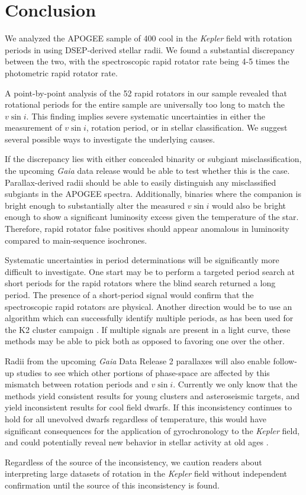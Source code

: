 \documentclass[manuscript]{aastex6}
\newcommand{\vsini}{\ensuremath{v \sin i}}
\newcommand{\Kepler}{\mbox{\textit{Kepler}}}
\newcommand{\Gaia}{\mbox{\textit{Gaia}}}
\begin{document}
\section{Conclusion}
\label{sec:conclusions}

We analyzed the APOGEE sample of 400 cool in the \Kepler{} field with 
rotation periods in \citet{McQuillan14} using DSEP-derived stellar radii. We 
found a substantial discrepancy between the two, with the spectroscopic rapid
rotator rate being 4-5 times the photometric rapid rotator rate. 

A point-by-point analysis of the 52 rapid rotators in our sample revealed that
rotational periods for the entire sample are universally too long to match the 
\vsini{}. This finding implies severe systematic uncertainties in either the
measurement of \vsini{}, rotation period, or in stellar classification. We
suggest several possible ways to investigate the underlying causes.

If the discrepancy lies with either concealed binarity or subgiant
misclassification, the upcoming \Gaia{} data release would be able to
test whether this is the case. Parallax-derived radii should be able to
easily distinguish any misclassified subgiants in the APOGEE spectra.
Additionally, binaries where the companion is bright enough to
substantially alter the measured \vsini{} would also be bright enough to
show a significant luminosity excess given the temperature of the star.
Therefore, rapid rotator false positives should appear anomalous in
luminosity compared to main-sequence isochrones.

Systematic uncertainties in period determinations will be significantly more
difficult to investigate. One start may be to perform a targeted period search
at short periods for the rapid rotators where the blind search returned a long
period. The presence of a short-period signal would confirm that the
spectroscopic rapid rotators are physical. Another direction would be to use an
algorithm which can successfully identify multiple periods, as has been used
for the K2 cluster campaign \citep{Rebull16,Rebull17}. If multiple signals are
present in a light curve, these methods may be able to pick both as opposed to
favoring one over the other.

Radii from the upcoming \Gaia{} Data Release 2 parallaxes will also enable 
follow-up studies to see which other portions of phase-space are affected by 
this mismatch between rotation periods and \vsini{}. Currently we only know 
that the methods yield consistent results for young clusters and 
asteroseismic targets, and yield inconsistent results for cool field dwarfs. If
this inconsistency continues to hold for all unevolved dwarfs regardless of
temperature, this would have significant consequences for the application of
gyrochronology to the \Kepler{} field, and could potentially reveal new
behavior in stellar activity at old ages \citep{vanSaders16}.

Regardless of the source of the inconsistency, we caution readers about 
interpreting large datasets of rotation in the \Kepler{} field without 
independent confirmation until the source of this inconsistency is found.




\end{document}
